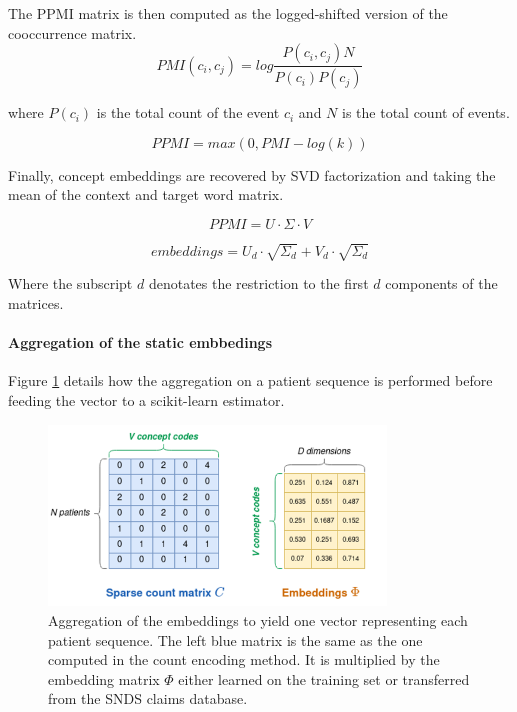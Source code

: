 \documentclass[french,12pt,twoside,a4paper]{book}
\begin{document}
\begin{appendices}
  The PPMI matrix is then computed as the logged-shifted version of the
  cooccurrence matrix.
  \begin{equation}\label{eq:pmi}
    PMI(c_i, c_j) = log\frac{P(c_i, c_j)N}{P(c_i)P(c_j)}
  \end{equation}

  where $P(c_i)$ is the total count of the event $c_i$ and $N$ is the total count of events.

  \begin{equation}\label{eq:ppmi}
    PPMI = max(0, PMI - log(k))
  \end{equation}

  Finally, concept embeddings are recovered by SVD factorization and taking the
  mean of the context and target word matrix.

  \begin{equation}
    PPMI = U \cdot \Sigma \cdot V
  \end{equation}

  \begin{equation}
    embeddings = U_d \cdot \sqrt{\Sigma_d} + V_d \cdot \sqrt{\Sigma_d}
  \end{equation}

  Where the subscript $d$ denotates the restriction to the first $d$ components of
  the matrices.

  \paragraph{Aggregation of the static embbedings}

  Figure \ref{apd:fig:pipelines:static_embeddings_aggregation} details how the aggregation on a
  patient sequence is performed before feeding the vector to a scikit-learn estimator.

  \begin{figure}
    \centering
    \includegraphics[width=0.8\textwidth]{img/chapter_3/static_embeddings_aggregation.png}
    \caption{Aggregation of the embeddings to yield one vector representing each
      patient sequence. The left blue matrix is the same as the one computed in
      the count encoding method. It is multiplied by the embedding matrix $\Phi$ either
      learned on the training set or transferred from the SNDS claims database.
    }\label{apd:fig:pipelines:static_embeddings_aggregation}
  \end{figure}


\end{appendices}
\end{document}
